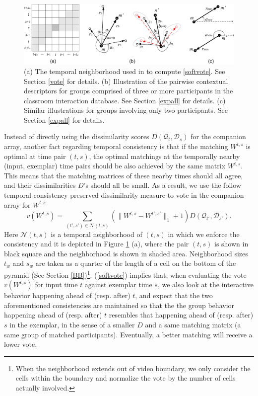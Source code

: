\documentclass[10pt,twocolumn,letterpaper]{article}
\begin{document}
\begin{figure}[t]
\begin{center}
\includegraphics[scale=1.2]{all_illu.png}
\end{center}
\caption{(a) The temporal neighborhood used in to compute \ref{softvote}. See Section \ref{vote} for details. (b) Illustration of the pairwise contextual descriptors for groups comprised of three or more participants in the classroom interaction database. See Section \ref{expall} for details. (c) Similar illustrations for groups involving only two participants. See Section \ref{expall} for details.}
\label{all_illu}
\end{figure}

Instead of directly using the dissimilarity scores $D(\mathcal{Q}_{t}, \mathcal{D}_{s})$ for the companion array, another fact regarding temporal consistency is that if the matching $W^{t,s}$ is optimal at time pair $(t,s)$, the optimal matchings at the temporally nearby (input, exemplar) time pairs should be also achieved by the same matrix $W^{t,s}$. This means that the matching matrices of these nearby times should all agree, and their dissimilarities $D$'s should all be small.  As a result, we use the follow temporal-consistency preserved dissimilarity measure to vote in the companion array for $W^{t,s}$
\begin{equation}
\label{softvote}
v(W^{t,s})=\sum_{(t',s')\in\mathcal{N}(t,s)}(\|W^{t,s}-W^{t',s'}\|_{1}+1)D(\mathcal{Q}_{t'}, \mathcal{D}_{s'}).
\end{equation}
Here $\mathcal{N}(t,s)$ is a temporal neighborhood of $(t,s)$ in which we enforce the consistency and it is depicted in Figure \ref{all_illu} (a), where the pair $(t,s)$ is shown in black square and the neighborhood is shown in shaded area. Neighborhood sizes $t_{w}$ and $s_{w}$ are taken as a quarter of the length of a cell on the bottom of the pyramid (See Section \ref{BB})\footnote{When the neighborhood extends out of video boundary, we only consider the cells within the boundary and normalize the vote by the number of cells actually involved.}. (\ref{softvote}) implies that, when evaluating the vote $v(W^{t,s})$ for input time $t$ against exemplar time $s$, we also look at the interactive behavior happening ahead of (resp. after) $t$, and expect that the two aforementioned consistencies are maintained so that the the group behavior happening ahead of (resp. after) $t$ resembles that happening ahead of (resp. after) $s$ in the exemplar, in the sense of a smaller $D$ and a same matching matrix (a same group of matched participants). Eventually, a better matching will receive a lower vote. 
\end{document}

